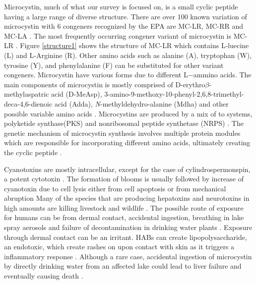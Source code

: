 Microcystin, much of what our survey is focused on, is a small cyclic peptide having a large range of diverse structure. There are over 100 known variation of microcystin with 6 congeners recognized by the EPA are MC-LR, MC-RR and MC-LA \cite{puddick_modulation_2016}. The most frequently occurring congener variant of microcystin is MC-LR \cite{rastogi_cyanotoxin-microcystins:_2014}. Figure \ref{structure1} shows the structure of MC-LR which contains L-luecine (L) and L-Arginine (R). Other amino acids such as alanine (A), tryptophan (W), tyrosine (Y), and phenylalanine (F) can be substituted for other variant congeners. Microcystin have various forms due to different L$-$ammino acids. The main components of microcystin is mostly comprised of D-erythro$\beta$-methylaspatric acid (D-MeAsp), 3-amino-9-methoxy-10-phenyl-2,6,8-trimethyl-deca-4,6-dienoic acid (Adda), \textit{N}-methyldehydro-alanine (Mdha) and other possible variable amino acids \cite{trogen_conformational_1996,nishizawa_genetic_1999}.
Microcystins are produced by a mix of to systems, polyketide synthase(PKS) and nonribosomal peptide synthetase (NRPS) \cite{tillett_structural_2000}.
The genetic mechanism of microcystin synthesis involves multiple protein modules which are responsible for incorporating different amino acids, ultimately creating the cyclic peptide \cite{nishizawa_genetic_1999}.

Cyanotoxins are mostly intracellular, except for the case of cylindrospermonspin, a potent cytotoxin \cite{rastogi_cyanotoxin-microcystins:_2014}. The formation of blooms is usually followed by increase of cyanotoxin due to cell lysis either from cell apoptosis or from mechanical abruption \cite{rohrlack_fate_2007} Many of the species that are producing hepatoxins and neurotoxins in high amounts are killing livestock and wildlife \cite{anderson_harmful_2002}. The possible route of exposure  for humans can be from dermal contact, accidental ingestion, breathing in lake spray aerosols and failure of decontamination in drinking water plants \cite{may_aerosol_2018,codd_cyanobacterial_1999}. Exposure through dermal contact can be an irritant. HABs can create lipopolysaccharide, an endotoxic, which create rashes on upon contact with skin as it triggers a inflammatory response \cite{ moore_richard_cyanobacterial_1993}. Although a rare case, accidental ingestion of microcystin by directly drinking water from an affected lake could  lead to liver failure and eventually causing death \cite{monks_potent_2007}.

